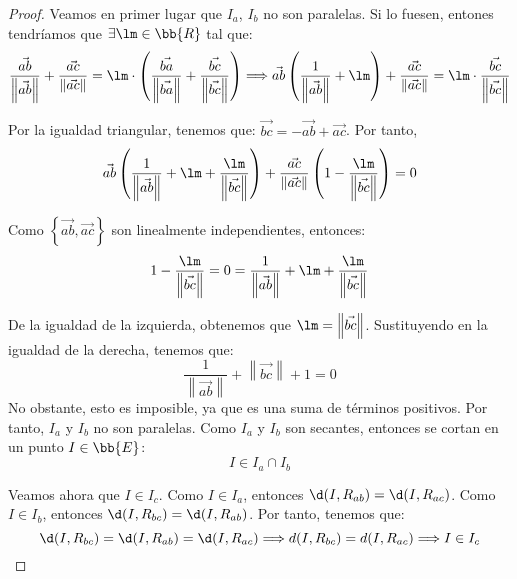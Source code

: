 \begin{proof}
    Veamos en primer lugar que $I_a$, $I_b$ no son paralelas. Si lo fuesen,
    entones tendríamos que $\exists \lm \in \bb{R}$ tal que:
    \begin{equation*}
        \frac{\vec{ab}}{\left\|\vec{ab}\right\|} + \frac{\vec{ac}}{\left\|\vec{ac}\right\|} = \lm 
        \cdot \left(\frac{\vec{ba}}{\left\|\vec{ba}\right\|} + \frac{\vec{bc}}{\left\|\vec{bc}\right\|}\right)
        \Longrightarrow \vec{ab}\left(\frac{1}{\left\|\vec{ab}\right\|} + \lm\right)
        + \frac{\vec{ac}}{\left\|\vec{ac}\right\|} = \lm \cdot \frac{\vec{bc}}{\left\|\vec{bc}\right\|}
    \end{equation*}

    Por la igualdad triangular, tenemos que: $\vec{bc} = -\vec{ab} + \vec{ac}$. Por tanto,
    \begin{equation*}
        \vec{ab}\left(\frac{1}{\left\|\vec{ab}\right\|} + \lm + \frac{\lm}{\left\|\vec{bc}\right\|}\right)
        + \frac{\vec{ac}}{\left\|\vec{ac}\right\|}\left(1 - \frac{\lm}{\left\|\vec{bc}\right\|}\right) = 0
    \end{equation*}

    Como $\left\{\vec{ab},\vec{ac}\right\}$ son linealmente independientes, entonces:
    \begin{equation*}
        1 - \frac{\lm}{\left\|\vec{bc}\right\|} = 0 = \frac{1}{\left\|\vec{ab}\right\|} + \lm + \frac{\lm}{\left\|\vec{bc}\right\|}
    \end{equation*}

    De la igualdad de la izquierda, obtenemos que $\lm = \left\|\vec{bc}\right\|$. Sustituyendo en la igualdad de la derecha, tenemos que:
    \begin{equation*}
        \frac{1}{\left\|\vec{ab}\right\|} + \left\|\vec{bc}\right\| + 1 = 0
    \end{equation*}
    No obstante, esto es imposible, ya que es una suma de términos positivos. Por tanto, $I_a$ y $I_b$ no son paralelas.
    Como $I_a$ y $I_b$ son secantes, entonces se cortan en un punto $I\in \bb{E}$:
    \begin{equation*}
        I\in I_a\cap I_b
    \end{equation*}
    
    Veamos ahora que $I\in I_c$. Como $I\in I_a$, entonces $\d(I, R_{ab})=\d(I, R_{ac})$.
    Como $I\in I_b$, entonces $\d(I, R_{bc})=\d(I, R_{ab})$. Por tanto, tenemos que:
    \begin{equation*}
        \d(I, R_{bc})=\d(I, R_{ab})=\d(I, R_{ac}) \Longrightarrow d(I, R_{bc})=d(I, R_{ac}) \Longrightarrow I\in I_c
    \end{equation*}


\end{proof}
